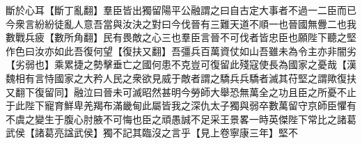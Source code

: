 斷於心耳【斷丁亂翻】羣臣皆出獨留陽平公融謂之曰自古定大事者不過一二臣而已今衆言紛紛徒亂人意吾當與汝決之對曰今伐晉有三難天道不順一也晉國無釁二也我數戰兵疲【數所角翻】民有畏敵之心三也羣臣言晉不可伐者皆忠臣也願陛下聽之堅作色曰汝亦如此吾復何望【復扶又翻】吾彊兵百萬資仗如山吾雖未為令主亦非闇劣【劣弱也】乘累捷之勢擊垂亡之國何患不克豈可復留此殘寇使長為國家之憂哉【漢魏相有言恃國家之大矜人民之衆欲見威于敵者謂之驕兵兵驕者滅其苻堅之謂歟復扶又翻下復留同】融泣曰晉未可滅昭然甚明今勞師大舉恐無萬全之功且臣之所憂不止于此陛下寵育鮮卑羌羯布滿畿甸此屬皆我之深仇太子獨與弱卒數萬留守京師臣懼有不虞之變生于腹心肘腋不可悔也臣之頑愚誠不足采王景畧一時英傑陛下常比之諸葛武侯【諸葛亮諡武侯】獨不記其臨沒之言乎【見上卷寧康三年】堅不